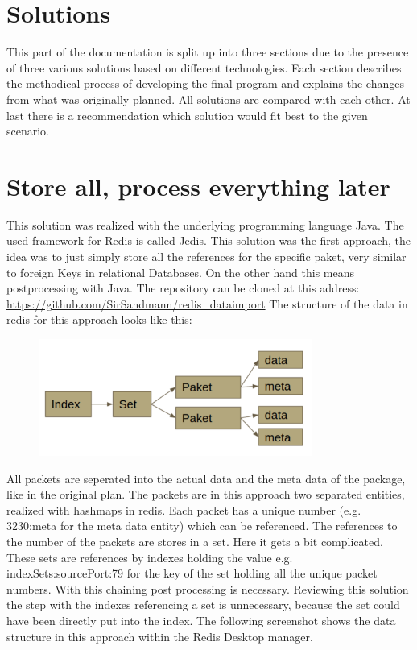 \chapter{Solutions}
This part of the documentation is split up into three sections due to the presence of three various solutions based on different technologies. Each section describes the methodical process of developing the final program and explains the changes from what was originally planned. All solutions are compared with each other. At last there is a recommendation which solution would fit best to the given scenario. 

\chapter{Store all, process everything later}
This solution was realized with the underlying programming language Java. The used framework for Redis is called Jedis. This solution was the first approach, the idea was to just simply store all the references for the specific paket, very similar to foreign Keys in relational Databases. On the other hand this means postprocessing with Java. The repository can be cloned at this address:
\url{ https://github.com/SirSandmann/redis_dataimport}
The structure of the data in redis for this approach looks like this:

  \begin{figure}[htb!]
	\centerline{\includegraphics[width=0.8\textwidth]{resources/solution1-1.png}}
\end{figure}

All packets are seperated into the actual data and the meta data of the package, like in the original plan. The packets are in this approach two separated entities, realized with hashmaps in redis. Each packet has a unique number (e.g. 3230:meta for the meta data entity) which can be referenced. The references to the number of the packets are stores in a set. Here it gets a bit complicated. These sets are references by indexes holding the value e.g. indexSets:sourcePort:79 for the key of the set holding all the unique packet numbers. With this chaining post processing is necessary. Reviewing this solution the step with the indexes referencing a set is unnecessary, because the set could have been directly put into the index. The following screenshot shows the data structure in this approach within the Redis Desktop manager.

